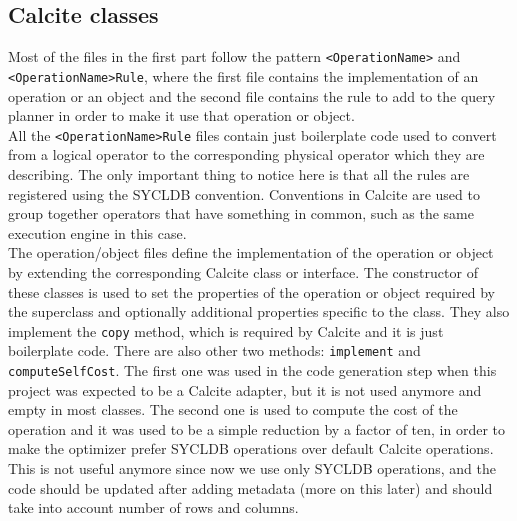 \documentclass[a4paper, 10pt]{article}
\begin{document}
\subsection{Calcite classes}

Most of the files in the first part follow the pattern \texttt{<OperationName>} and \texttt{<OperationName>Rule}, where the first file contains the implementation of an operation or an object and the second file contains the rule to add to the query planner in order to make it use that operation or object.
\\
All the \texttt{<OperationName>Rule} files contain just boilerplate code used to convert from a logical operator to the corresponding physical operator which they are describing. The only important thing to notice here is that all the rules are registered using the SYCLDB convention. Conventions in Calcite are used to group together operators that have something in common, such as the same execution engine in this case.
\\
The operation/object files define the implementation of the operation or object by extending the corresponding Calcite class or interface. The constructor of these classes is used to set the properties of the operation or object required by the superclass and optionally additional properties specific to the class. They also implement the \texttt{copy} method, which is required by Calcite and it is just boilerplate code. There are also other two methods: \texttt{implement} and \texttt{computeSelfCost}. The first one was used in the code generation step when this project was expected to be a Calcite adapter, but it is not used anymore and empty in most classes. The second one is used to compute the cost of the operation and it was used to be a simple reduction by a factor of ten, in order to make the optimizer prefer SYCLDB operations over default Calcite operations. This is not useful anymore since now we use only SYCLDB operations, and the code should be updated after adding metadata (more on this later) and should take into account number of rows and columns.
\end{document}
